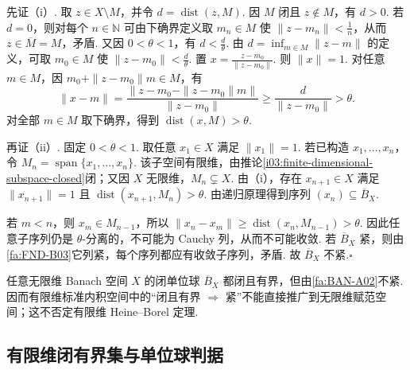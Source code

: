 \begin{FAProof}
先证（i）. 取 \(\displaystyle z\in X\setminus M\)，并令 \(\displaystyle d=\operatorname{dist}(z,M)\). 因 \(\displaystyle M\) 闭且 \(\displaystyle z\notin M\)，有 \(\displaystyle d>0\). 若 \(\displaystyle d=0\)，则对每个 \(\displaystyle n\in\mathbb N\) 可由下确界定义取 \(\displaystyle m_n\in M\) 使 \(\displaystyle \|z-m_n\|<\frac{1}{n}\)，从而 \(\displaystyle z\in\overline M=M\)，矛盾. 又因 \(\displaystyle 0<\theta<1\)，有 \(\displaystyle d<\frac{d}{\theta}\). 由 \(\displaystyle d=\inf_{m\in M}\|z-m\|\) 的定义，可取 \(\displaystyle m_0\in M\) 使
\(\displaystyle \|z-m_0\|<\frac{d}{\theta}\).
置 \(\displaystyle x=\frac{z-m_0}{\|z-m_0\|}\). 则 \(\displaystyle \|x\|=1\). 对任意 \(\displaystyle m\in M\)，因 \(\displaystyle m_0+\|z-m_0\|m\in M\)，有
\[
\|x-m\| =\frac{\|z-m_0-\|z-m_0\|m\|}{\|z-m_0\|} \geqslant\frac{d}{\|z-m_0\|} >\theta.
\]
对全部 \(\displaystyle m\in M\) 取下确界，得到 \(\displaystyle \operatorname{dist}(x,M)>\theta\).

再证（ii）. 固定 \(\displaystyle 0<\theta<1\). 取任意 \(\displaystyle x_1\in X\) 满足 \(\displaystyle \|x_1\|=1\). 若已构造 \(\displaystyle x_1,\dots,x_n\)，令
\(\displaystyle M_n=\operatorname{span}\{x_1,\dots,x_n\}\).
该子空间有限维，由推论\ref{i03:finite-dimensional-subspace-closed}闭；又因 \(\displaystyle X\) 无限维，\(\displaystyle M_n\subsetneq X\). 由（i），存在 \(\displaystyle x_{n+1}\in X\) 满足 \(\displaystyle \|x_{n+1}\|=1\) 且 \(\displaystyle \operatorname{dist}(x_{n+1},M_n)>\theta\). 由递归原理得到序列 \(\displaystyle (x_n)\subseteq\overline B_X\).

若 \(\displaystyle m<n\)，则 \(\displaystyle x_m\in M_{n-1}\)，所以
\(\displaystyle \|x_n-x_m\|\geqslant\operatorname{dist}(x_n,M_{n-1})>\theta\).
因此任意子序列仍是 \(\displaystyle \theta\)-分离的，不可能为 Cauchy 列，从而不可能收敛. 若 \(\displaystyle \overline B_X\) 紧，则由\autoref{fa:FND-B03}它列紧，每个序列都应有收敛子序列，矛盾. 故 \(\displaystyle \overline B_X\) 不紧.\hfill\(\square\)
\end{FAProof}

\begin{FACounterexample}[闭且有界不蕴含紧]
任意无限维 Banach 空间 \(\displaystyle X\) 的闭单位球 \(\displaystyle \overline B_X\) 都闭且有界，但由\autoref{fa:BAN-A02}不紧. 因而有限维标准内积空间中的“闭且有界 \(\displaystyle \Rightarrow\) 紧”不能直接推广到无限维赋范空间；这不否定有限维 Heine--Borel 定理.
\end{FACounterexample}

\subsection{有限维闭有界集与单位球判据}

